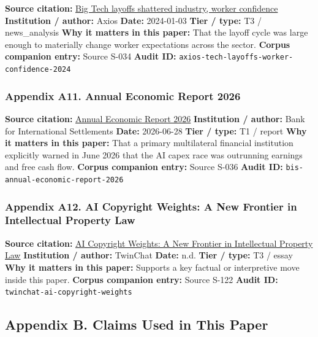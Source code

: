 \documentclass[
  american,
  11pt,
  letterpaper,
]{article}
\begin{document}
\textbf{Source citation:}
\href{https://www.axios.com/2024/01/03/tech-layoffs-google-microsoft-employees-impact-anxiety}{Big
Tech layoffs shattered industry, worker confidence} \textbf{Institution
/ author:} Axios \textbf{Date:} 2024-01-03 \textbf{Tier / type:} T3 /
news\_analysis \textbf{Why it matters in this paper:} That the layoff
cycle was large enough to materially change worker expectations across
the sector. \textbf{Corpus companion entry:} Source S-034 \textbf{Audit
ID:} \texttt{axios-tech-layoffs-worker-confidence-2024}

\subsubsection{Appendix A11. Annual Economic Report
2026}\label{appendix-a11-annual-economic-report-2026}

\textbf{Source citation:}
\href{https://www.bis.org/publ/arpdf/ar2026e.pdf}{Annual Economic Report
2026} \textbf{Institution / author:} Bank for International Settlements
\textbf{Date:} 2026-06-28 \textbf{Tier / type:} T1 / report \textbf{Why
it matters in this paper:} That a primary multilateral financial
institution explicitly warned in June 2026 that the AI capex race was
outrunning earnings and free cash flow. \textbf{Corpus companion entry:}
Source S-036 \textbf{Audit ID:} \texttt{bis-annual-economic-report-2026}

\subsubsection{Appendix A12. AI Copyright Weights: A New Frontier in
Intellectual Property
Law}\label{appendix-a12-ai-copyright-weights-a-new-frontier-in-intellectual-property-law}

\textbf{Source citation:}
\href{https://medium.com/twinchat/ai-copyright-weights-a-new-frontier-in-intellectual-property-law-d8ee1b6c55ee}{AI
Copyright Weights: A New Frontier in Intellectual Property Law}
\textbf{Institution / author:} TwinChat \textbf{Date:} n.d. \textbf{Tier
/ type:} T3 / essay \textbf{Why it matters in this paper:} Supports a
key factual or interpretive move inside this paper. \textbf{Corpus
companion entry:} Source S-122 \textbf{Audit ID:}
\texttt{twinchat-ai-copyright-weights}

\subsection{Appendix B. Claims Used in This
Paper}\label{appendix-b.-claims-used-in-this-paper}
\end{document}
